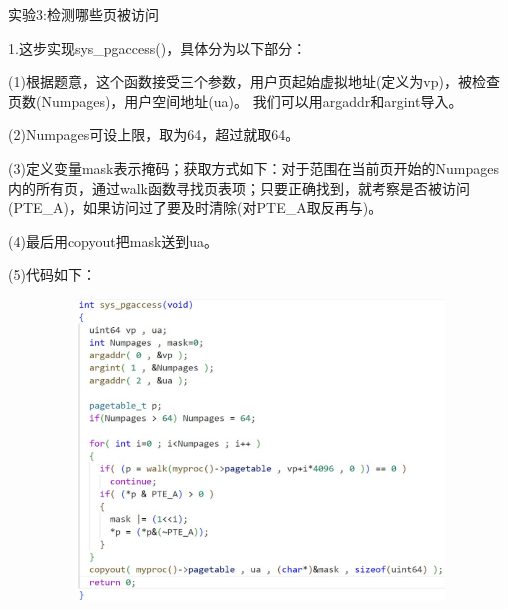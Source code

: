 \documentclass[12pt]{article}
\begin{document}
\begin{figure}[!h]
    \centering
    \hfill
\end{figure}
\newpage
\begin{Large}
	\noindent 实验3:检测哪些页被访问\\
\end{Large}
1.这步实现sys\_pgaccess()，具体分为以下部分：\par
(1)根据题意，这个函数接受三个参数，用户页起始虚拟地址(定义为vp)，被检查页数(Numpages)，用户空间地址(ua)。
我们可以用argaddr和argint导入。\par
(2)Numpages可设上限，取为64，超过就取64。\par
(3)定义变量mask表示掩码；获取方式如下：对于范围在当前页开始的Numpages内的所有页，通过walk函数寻找页表项；只要正确找到，就考察是否被访问(PTE\_A)，如果访问过了要及时清除(对PTE\_A取反再与)。\par
(4)最后用copyout把mask送到ua。\par
(5)代码如下：\\
\begin{figure}[h]
	\centering
	\includegraphics[height=8cm,width=12cm]{lab3-12.jpg}
\end{figure}\\
\end{document}
